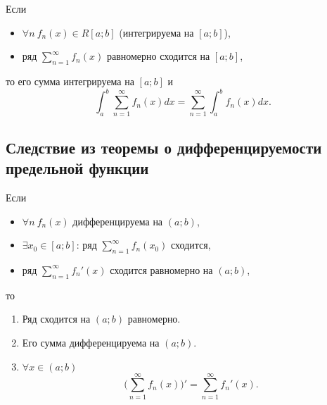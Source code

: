 \begin{corollary}
    Если
    \begin{itemize}
        \item $\forall n \ f_n(x) \in R[a;b]$ (интегрируема на $[a;b]$),
        \item ряд $\sum_{n=1}^{\infty}f_n(x)$ равномерно сходится на $[a;b]$,
    \end{itemize}
    то его сумма интегрируема на $[a;b]$ и
    \[
        \int_{a}^{b}\sum_{n=1}^{\infty}f_n(x)dx = \sum_{n=1}^{\infty}\int_{a}^{b}f_n(x)dx.
    \]
\end{corollary}

\subsection{Следствие из теоремы о дифференцируемости предельной функции}

\begin{corollary}
    Если
    \begin{itemize}
        \item $\forall n \ f_n(x)$ дифференцируема на $(a;b)$,
        \item $\exists x_0 \in [a;b]$: ряд $\sum_{n=1}^{\infty}f_n(x_0)$ сходится,
        \item ряд $\sum_{n=1}^{\infty}f_n'(x)$ сходится равномерно на $(a;b)$,
    \end{itemize}
    то \begin{enumerate}
        \item Ряд сходится на $(a;b)$ равномерно.
        \item Его сумма дифференцируема на $(a;b)$.
        \item $\forall x \in (a;b)$
              \[
                  \bigg(\sum_{n=1}^{\infty}f_n(x)\bigg)' = \sum_{n=1}^{\infty}f_n'(x).
              \]
    \end{enumerate}
\end{corollary}